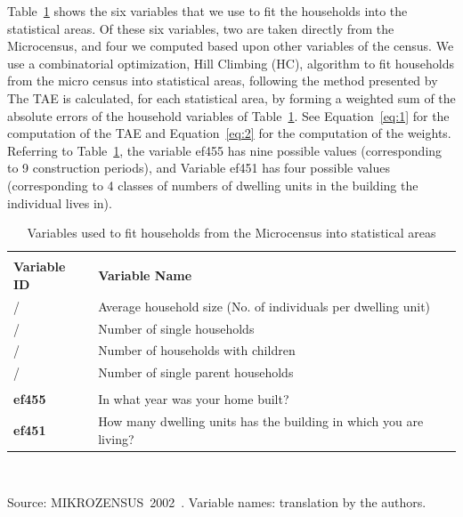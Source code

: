 \documentclass[11pt]{IJM-article}
\begin{document}
Table~\ref{tab:2} shows the six variables that we use to fit the households
into the statistical areas. Of these six variables, two are taken directly from
the Microcensus, and four we computed based upon other variables of the census.
We use a combinatorial optimization, Hill Climbing (HC), algorithm to fit
households from the micro census into statistical areas, following the method
presented by  The TAE is calculated, for
each statistical area, by forming a weighted sum of the absolute errors of the
household variables of Table~\ref{tab:2}. See Equation~\ref{eq:1} for the
computation of the TAE and Equation~\ref{eq:2} for the computation of the
weights. Referring to Table~\ref{tab:2}, the variable ef455 has nine possible
values (corresponding to 9 construction periods), and Variable ef451 has four
possible values (corresponding to 4 classes of numbers of dwelling units in the
building the individual lives in).\\

\begin{table}[htb]
    \centering
    \caption{Variables used to fit households from the Microcensus into
    statistical areas }
    \label{tab:2}
    \begin{tabular}{l l}
        \addlinespace \toprule
        \multicolumn{2}{l}{\textbf{Constructed variables} }\\ 
        \textbf{Variable ID} & \textbf{Variable Name} \\ 
        / & Average household size (No. of individuals per dwelling unit)\\ 
        / & Number of single households\\ 
        / & Number of households with children\\ 
        / & Number of single parent households\\ 
        \midrule \addlinespace
        \multicolumn{2}{l}{\textbf{Variables directly taken from the micro-census} }\\
        \textbf{ef455} & In what year was your home built?\\ 
        \textbf{ef451} & How many dwelling units has the building in which you 
            are living?\\ 
        \bottomrule 
    \end{tabular} \\
        \begin{footnotesize} 
            Source: MIKROZENSUS~2002~\cite{StatistischesBundesamt.2002}. 
            Variable names: translation by the authors.\\ 
        \end{footnotesize} 
\end{table}
\end{document}
